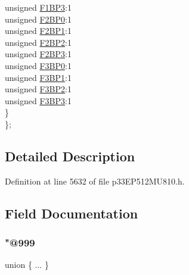 \begin{DoxyCompactItemize}
\begin{tabbing}
\>\>unsigned \hyperlink{structtag_c2_b_u_f_p_n_t1_b_i_t_s_a203b28a82e4e91aed0387156204be668}{F1BP3}:1\\
\>\>unsigned \hyperlink{structtag_c2_b_u_f_p_n_t1_b_i_t_s_a07d8f96ad053958a0c4559faed8c13bd}{F2BP0}:1\\
\>\>unsigned \hyperlink{structtag_c2_b_u_f_p_n_t1_b_i_t_s_a580814a746cc941d3d99dcf34ac742cf}{F2BP1}:1\\
\>\>unsigned \hyperlink{structtag_c2_b_u_f_p_n_t1_b_i_t_s_a0f1374b0bc73a50a564ab4208e7595f2}{F2BP2}:1\\
\>\>unsigned \hyperlink{structtag_c2_b_u_f_p_n_t1_b_i_t_s_a2c3e484b98caab3ee173c6b944024c98}{F2BP3}:1\\
\>\>unsigned \hyperlink{structtag_c2_b_u_f_p_n_t1_b_i_t_s_a753d4513483516e79f634012dc16c54e}{F3BP0}:1\\
\>\>unsigned \hyperlink{structtag_c2_b_u_f_p_n_t1_b_i_t_s_af454b88a9aa90745634e8b8813d48c68}{F3BP1}:1\\
\>\>unsigned \hyperlink{structtag_c2_b_u_f_p_n_t1_b_i_t_s_a1e75d1073b686abfd1137ee647ae3147}{F3BP2}:1\\
\>\>unsigned \hyperlink{structtag_c2_b_u_f_p_n_t1_b_i_t_s_aee9920932ab1a451012ad6a2f4afaa19}{F3BP3}:1\\
\>\} \\
\}; \\

\end{tabbing}\end{DoxyCompactItemize}


\subsection{Detailed Description}


Definition at line 5632 of file p33\+E\+P512\+M\+U810.\+h.



\subsection{Field Documentation}
\mbox{\label{structtag_c2_b_u_f_p_n_t1_b_i_t_s_ab77c2c25de510a879a54813fed484ad3}} 
\subsubsection{\texorpdfstring{"@999}{@999}}
{\footnotesize\ttfamily union \{ ... \} }

